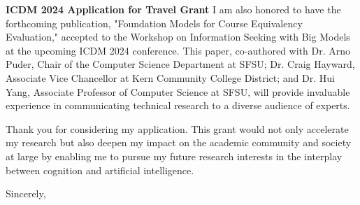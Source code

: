 \documentclass[letterpaper, 10pt]{letter}
\begin{document}
\begin{letter}{\textbf{ICDM 2024 Application for Travel Grant}}
    I am also honored to have the forthcoming publication, "Foundation Models for Course Equivalency Evaluation," accepted to the Workshop
    on Information Seeking with Big Models at the upcoming ICDM 2024 conference.  This paper, co-authored with Dr. Arno Puder, Chair of the
    Computer Science Department at SFSU; Dr. Craig Hayward, Associate Vice Chancellor at Kern Community College District; and Dr. Hui Yang,
    Associate Professor of Computer Science at SFSU, will provide invaluable experience in communicating technical research to a diverse
    audience of experts.

    Thank you for considering my application. This grant would not only accelerate my research but also deepen my impact on the academic
    community and society at large by enabling me to pursue my future research interests in the interplay between cognition and artificial
    intelligence.

    \vspace*{1cm}
    \closing{Sincerely,}

\end{letter}
\end{document}
